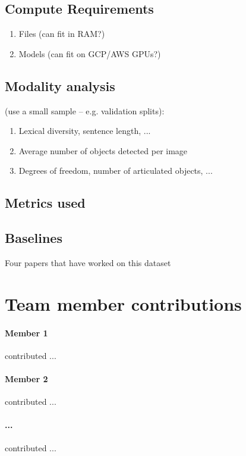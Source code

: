 \documentclass[11pt,a4paper]{article}
\begin{document}
\subsection{Compute Requirements}
  \begin{enumerate}
    \item Files (can fit in RAM?)
    \item Models (can fit on GCP/AWS GPUs?)
  \end{enumerate}
\subsection{Modality analysis}
(use a small sample -- e.g. validation splits):
  \begin{enumerate}
    \item Lexical diversity, sentence length, ...
    \item Average number of objects detected per image
    \item Degrees of freedom, number of articulated objects, ...
  \end{enumerate}
\subsection{Metrics used}
\subsection{Baselines} 
Four papers that have worked on this dataset

\clearpage
\section{Team member contributions}
\paragraph{Member 1} contributed ...

\paragraph{Member 2} contributed ...

\paragraph{...} contributed ...

\clearpage



\end{document}
